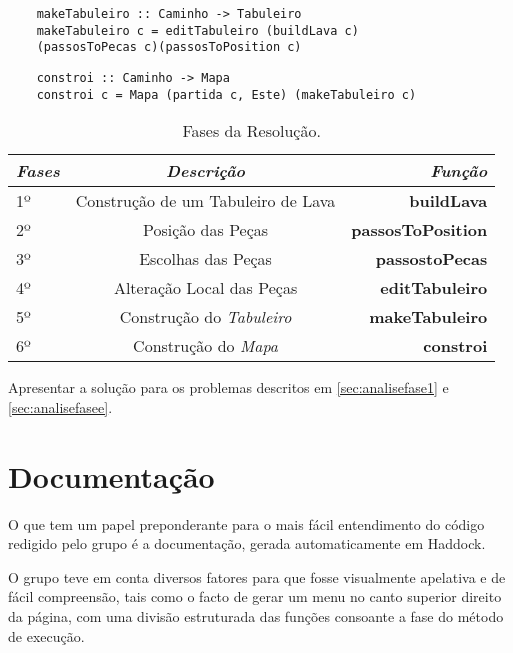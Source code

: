 \documentclass[a4paper]{report} %
\begin{document}
\begin{verbatim}
    makeTabuleiro :: Caminho -> Tabuleiro
    makeTabuleiro c = editTabuleiro (buildLava c)
    (passosToPecas c)(passosToPosition c)
\end{verbatim}    

\begin{verbatim}
    constroi :: Caminho -> Mapa
    constroi c = Mapa (partida c, Este) (makeTabuleiro c) 
\end{verbatim}
  
\begin{table}[!h]
\begin{center}
\begin{tabular}{|l|c|r|}
    \hline
  \emph{Fases} & \emph{Descrição} & \emph{Função}\\
    \hline
  1º & Construção de um Tabuleiro de Lava & \textbf{buildLava} \\
  \hline
  2º & Posição das Peças & \textbf{passosToPosition} \\
    \hline
    3º & Escolhas das Peças & \textbf{passostoPecas} \\
    \hline
    4º & Alteração Local das Peças & \textbf{editTabuleiro} \\
    \hline
    5º & Construção do \emph{Tabuleiro} & \textbf{makeTabuleiro} \\
    \hline
    6º & Construção do \emph{Mapa} & \textbf{constroi} \\
    \hline
    
\end{tabular}
\end{center}

\caption{Fases da Resolução.}
\label{tbl:tabela}
\end{table}

Apresentar a solução para os problemas descritos em \ref{sec:analisefase1} e \ref{sec:analisefasee}.

\newpage

\section{Documentação}

O que tem um papel preponderante para o mais fácil entendimento do código redigido pelo grupo é a documentação, gerada automaticamente em Haddock.

O grupo teve em conta diversos fatores para que fosse visualmente apelativa e de fácil compreensão, tais como o facto de gerar um menu no canto superior direito da página, com uma divisão estruturada das funções consoante a fase do método de execução.
\end{document}
